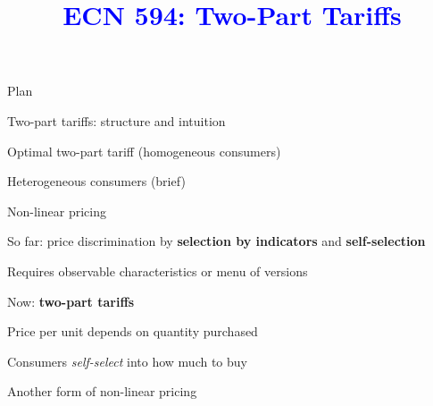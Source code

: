 \documentclass[notes,11pt, aspectratio=169]{beamer}
\title[]{\textcolor{blue}{ECN 594: Two-Part Tariffs}}
\author[PGP]{}
\institute[FRBNY]{\small{\begin{tabular}{c c c}
Nicholas Vreugdenhil \\
\end{tabular}}}
\date{}
\newenvironment{wideitemize}{\itemize\addtolength{\itemsep}{10pt}}{\enditemize}
\newenvironment{wideenumerate}{\enumerate\addtolength{\itemsep}{10pt}}{\endenumerate}
\begin{document}
\begin{frame}
\maketitle
  \centering
\end{frame}




\begin{frame}{Plan}
  \begin{wideenumerate}
    \item Two-part tariffs: structure and intuition
    \item Optimal two-part tariff (homogeneous consumers)
    \item Heterogeneous consumers (brief)
  \end{wideenumerate}
\end{frame}

\begin{frame}{Non-linear pricing}
	\begin{wideitemize}
		\item So far: price discrimination by \textbf{selection by indicators} and \textbf{self-selection}
		\begin{wideitemize}
			\vspace{5pt}
			\item Requires observable characteristics or menu of versions
		\end{wideitemize}
		\item Now: \textbf{two-part tariffs}
		\begin{wideitemize}
			\vspace{5pt}
			\item Price per unit depends on quantity purchased
			\item Consumers \textit{self-select} into how much to buy
		\end{wideitemize}
		\item Another form of non-linear pricing
	\end{wideitemize}
\end{frame}
\end{document}
